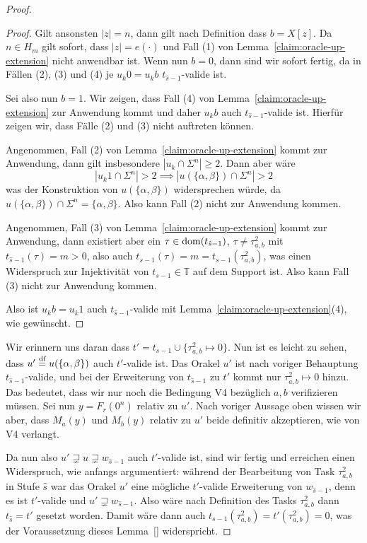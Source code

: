\begin{proof}
\begin{proof}
    Gilt ansonsten $|z|=n$, dann gilt nach Definition dass $b=X[z]$. 
    Da $n\in H_m$ gilt sofort, dass $|z|=e(\cdot)$ und Fall (1) von Lemma~\ref{claim:oracle-up-extension} nicht anwendbar ist.
    Wenn nun $b=0$, dann sind wir sofort fertig, da in Fällen (2), (3) und (4) je $u_k0=u_kb$ $t_{\hat{s}-1}$-valide ist.

    Sei also nun $b=1$. Wir zeigen, dass Fall (4) von Lemma~\ref{claim:oracle-up-extension} zur Anwendung kommt und daher $u_kb$ auch $t_{\hat{s}-1}$-valide ist.
    Hierfür zeigen wir, dass Fälle (2) und (3) nicht auftreten können.

    Angenommen, Fall (2)  von Lemma~\ref{claim:oracle-up-extension} kommt zur Anwendung, dann gilt insbesondere $|u_k\cap\Sigma^{n}|\geq 2$.
    Dann aber wäre
    \[ |u_k1\cap\Sigma^n|>2 \implies |u(\{\alpha,\beta\})\cap\Sigma^n|>2 \]
    was der Konstruktion von $u(\{\alpha,\beta\})$ widersprechen würde, da $u(\{\alpha,\beta\})\cap\Sigma^n=\{\alpha,\beta\}$.
    Also kann Fall (2) nicht zur Anwendung kommen.

    Angenommen, Fall (3) von Lemma~\ref{claim:oracle-up-extension} kommt zur Anwendung, dann existiert aber ein $\tau\in\operatorname{dom}(t_{\hat{s}-1})$, $\tau\neq\tau^2_{a,b}$ mit $t_{\hat{s}-1}(\tau)=m>0$, also auch $t_{s-1}(\tau)=m=t_{s-1}(\tau^2_{a,b})$, was einen Widerspruch zur Injektivität von $t_{s-1}\in\mathbb T$ auf dem Support ist. Also kann Fall (3) nicht zur Anwendung kommen.

    Also ist $u_kb=u_k1$ auch $t_{\hat{s}-1}$-valide mit Lemma~\ref{claim:oracle-up-extension}(4), wie gewünscht.
\end{proof}
Wir erinnern uns daran dass $t'=t_{s-1}\cup \{\tau^2_{a,b}\mapsto 0\}$.
Nun ist es leicht zu sehen, dass $u'\stackrel{\text{df}}{=} u(\{\alpha,\beta\})$ auch $t'$-valide ist. Das Orakel $u'$ ist nach voriger Behauptung $t_{\hat{s}-1}$-valide, und bei der Erweiterung von $t_{\hat{s}-1}$ zu $t'$ kommt nur $\tau^2_{a,b}\mapsto 0$ hinzu. Das bedeutet, dass wir nur noch die Bedingung V4 bezüglich $a,b$ verifizieren müssen.
Sei nun $y=F_r(0^n)$ relativ zu $u'$.
Nach voriger Aussage oben wissen wir aber, dass $M_a(y)$ und $M_b(y)$ relativ zu $u'$ beide definitiv akzeptieren, wie von V4 verlangt.

Da nun also $u'\sqsupsetneq u \sqsupsetneq w_{\hat{s}-1}$ auch $t'$-valide ist, sind wir fertig und erreichen einen Widerspruch, wie anfangs argumentiert: während der Bearbeitung von Task $\tau^2_{a,b}$ in Stufe $\hat{s}$ war das Orakel $u'$ eine mögliche $t'$-valide Erweiterung von $w_{\hat{s}-1}$, denn es ist $t'$-valide und $u'\sqsupsetneq w_{\hat{s}-1}$. Also wäre nach Definition des Tasks $\tau^2_{a,b}$ dann $t_{\hat{s}}=t'$ gesetzt worden.
Damit wäre dann auch $t_{s-1}(\tau^2_{a,b})=t'(\tau^2_{a,b})=0$, was der Voraussetzung dieses Lemma~\ref{} widerspricht.
\end{proof}

